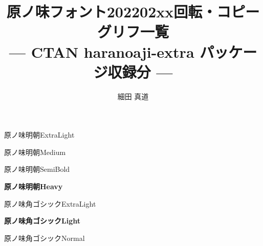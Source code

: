 \documentclass[dvipdfmx]{jsarticle}
\title{原ノ味フォント202202xx回転・コピーグリフ一覧 \\
--- CTAN haranoaji-extra パッケージ収録分 ---}
\author{細田 真道}
\begin{document}
\maketitle

\clearpage
\parindent=0pt
\fboxsep=0pt

\mcfamily\ltseries
{\Large 原ノ味明朝\textmd{ExtraLight}}

\testAll

\clearpage

\mcfamily\mdseries
{\Large 原ノ味明朝\textmd{Medium}}

\testAll

\clearpage

\mgfamily %
{\Large 原ノ味明朝\textmd{SemiBold}}

\testAll

\clearpage

\mcfamily\bfseries
{\Large 原ノ味明朝\textmd{Heavy}}

\testAll

\clearpage

\gtfamily\mdseries
{\Large 原ノ味角ゴシック\textmd{ExtraLight}}

\testAll

\clearpage

\gtfamily\bfseries
{\Large 原ノ味角ゴシック\textmd{Light}}

\testAll

\clearpage

\gtfamily\ebseries
{\Large 原ノ味角ゴシック\textmd{Normal}}

\testAll
\end{document}
